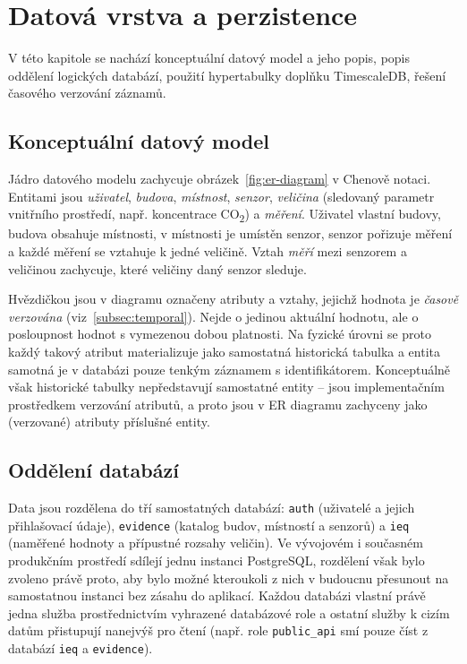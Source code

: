 \section{Datová vrstva a perzistence}
\label{sec:datova-vrstva}

V této kapitole se nachází konceptuální datový model a jeho popis, popis oddělení logických databází, použití hypertabulky doplňku TimescaleDB, řešení časového verzování záznamů.   

\subsection{Konceptuální datový model}

Jádro datového modelu zachycuje obrázek~\ref{fig:er-diagram} v Chenově notaci. Entitami jsou \emph{uživatel}, \emph{budova}, \emph{místnost}, \emph{senzor}, \emph{veličina} (sledovaný parametr vnitřního prostředí, např. koncentrace CO\textsubscript{2}) a \emph{měření}. Uživatel vlastní budovy, budova obsahuje místnosti, v místnosti je umístěn senzor, senzor pořizuje měření a každé měření se vztahuje k jedné veličině. Vztah \emph{měří} mezi senzorem a veličinou zachycuje, které veličiny daný senzor sleduje.

Hvězdičkou jsou v diagramu označeny atributy a vztahy, jejichž hodnota je \emph{časově verzována} (viz~\ref{subsec:temporal}). Nejde o jedinou aktuální hodnotu, ale o posloupnost hodnot s vymezenou dobou platnosti. Na fyzické úrovni se proto každý takový atribut materializuje jako samostatná historická tabulka a entita samotná je v databázi pouze tenkým záznamem s identifikátorem. Konceptuálně však historické tabulky nepředstavují samostatné entity -- jsou implementačním prostředkem verzování atributů, a proto jsou v ER diagramu zachyceny jako (verzované) atributy příslušné entity.



\subsection{Oddělení databází}

Data jsou rozdělena do tří samostatných databází: \texttt{auth} (uživatelé a jejich přihlašovací údaje), \texttt{evidence} (katalog budov, místností a senzorů) a \texttt{ieq} (naměřené hodnoty a přípustné rozsahy veličin). Ve vývojovém i současném produkčním prostředí sdílejí jednu instanci PostgreSQL, rozdělení však bylo zvoleno právě proto, aby bylo možné kteroukoli z nich v budoucnu přesunout na samostatnou instanci bez zásahu do aplikací. Každou databázi vlastní právě jedna služba prostřednictvím vyhrazené databázové role a ostatní služby k cizím datům přistupují nanejvýš pro čtení (např. role \texttt{public\_api} smí pouze číst z databází \texttt{ieq} a \texttt{evidence}).

